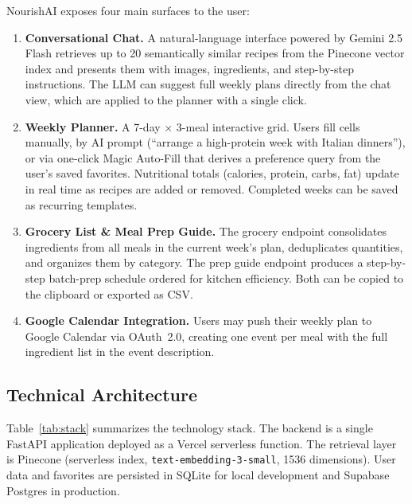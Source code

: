 \documentclass[12pt,letterpaper]{article}
\begin{document}
NourishAI exposes four main surfaces to the user:

\begin{enumerate}[leftmargin=*, itemsep=2pt]
  \item \textbf{Conversational Chat.} A natural-language interface powered by Gemini 2.5
    Flash retrieves up to 20 semantically similar recipes from the Pinecone vector index
    and presents them with images, ingredients, and step-by-step instructions. The LLM
    can suggest full weekly plans directly from the chat view, which are applied to the
    planner with a single click.

  \item \textbf{Weekly Planner.} A 7-day $\times$ 3-meal interactive grid. Users fill cells
    manually, by AI prompt (``arrange a high-protein week with Italian dinners''), or via
    one-click Magic Auto-Fill that derives a preference query from the user's saved
    favorites. Nutritional totals (calories, protein, carbs, fat) update in real time as
    recipes are added or removed. Completed weeks can be saved as recurring templates.

  \item \textbf{Grocery List \& Meal Prep Guide.} The grocery endpoint consolidates
    ingredients from all meals in the current week's plan, deduplicates quantities, and
    organizes them by category. The prep guide endpoint produces a step-by-step
    batch-prep schedule ordered for kitchen efficiency. Both can be copied to the clipboard
    or exported as CSV.

  \item \textbf{Google Calendar Integration.} Users may push their weekly plan to Google
    Calendar via OAuth~2.0, creating one event per meal with the full ingredient list in
    the event description.
\end{enumerate}

\subsection{Technical Architecture}

Table~\ref{tab:stack} summarizes the technology stack. The backend is a single FastAPI
application deployed as a Vercel serverless function. The retrieval layer is Pinecone
(serverless index, \texttt{text-embedding-3-small}, 1536 dimensions). User data and
favorites are persisted in SQLite for local development and Supabase Postgres in production.
\end{document}
